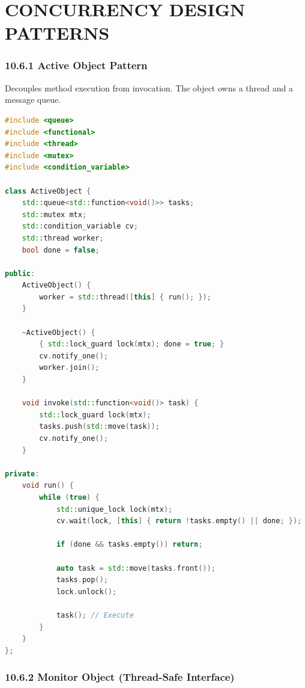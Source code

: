 \hypertarget{concurrency-design-patterns}{%
\chapter{CONCURRENCY DESIGN
PATTERNS}\label{concurrency-design-patterns}}

\hypertarget{active-object-pattern}{%
\subsection{10.6.1 Active Object Pattern}\label{active-object-pattern}}

Decouples method execution from invocation. The object owns a thread and
a message queue.

\begin{lstlisting}[language={C++}]
#include <queue>
#include <functional>
#include <thread>
#include <mutex>
#include <condition_variable>

class ActiveObject {
    std::queue<std::function<void()>> tasks;
    std::mutex mtx;
    std::condition_variable cv;
    std::thread worker;
    bool done = false;

public:
    ActiveObject() {
        worker = std::thread([this] { run(); });
    }

    ~ActiveObject() {
        { std::lock_guard lock(mtx); done = true; }
        cv.notify_one();
        worker.join();
    }

    void invoke(std::function<void()> task) {
        std::lock_guard lock(mtx);
        tasks.push(std::move(task));
        cv.notify_one();
    }

private:
    void run() {
        while (true) {
            std::unique_lock lock(mtx);
            cv.wait(lock, [this] { return !tasks.empty() || done; });
            
            if (done && tasks.empty()) return;
            
            auto task = std::move(tasks.front());
            tasks.pop();
            lock.unlock();
            
            task(); // Execute
        }
    }
};
\end{lstlisting}

\hypertarget{monitor-object-thread-safe-interface}{%
\subsection{10.6.2 Monitor Object (Thread-Safe
Interface)}\label{monitor-object-thread-safe-interface}}

